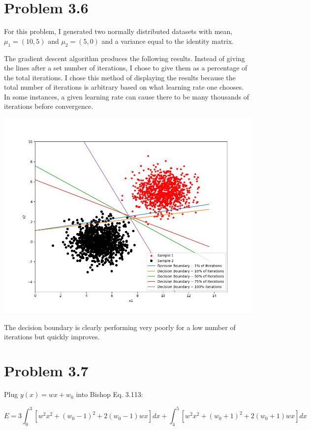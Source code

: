 \documentclass[12pt, letterpaper]{article}
\begin{document}
\section*{Problem 3.6}

For this problem, I generated two normally distributed datasets with mean, $\mu_{1} = (10, 5)$ and $\mu_{2} = (5, 0)$ and a variance equal to the identity matrix. 

The gradient descent algorithm produces the following results. Instead of giving the lines after a set number of iterations, I chose to give them as a percentage of the total iterations. I chose this method of displaying the results because the total number of iterations is arbitrary based on what learning rate one chooses. In some instances, a given learning rate can cause there to be many thousands of iterations before convergence. 

\begin{center}
\includegraphics[scale=0.6]{problem_6_a.png}
\end{center}

The decision boundary is clearly performing very poorly for a low number of iterations but quickly improves. 

\section*{Problem 3.7}

Plug $y(x) = w x + w_0$ into Bishop Eq. 3.113:

\begin{equation}
E=3 \int_{0}^{3}\left[w^{2} x^{2}+\left(w_{0}-1\right)^{2}+2\left(w_{0}-1\right) w x\right] d x+\int_{4}^{5}\left[w^{2} x^{2}+\left(w_{0}+1\right)^{2}+2\left(w_{0}+1\right) w x\right] d x
\end{equation}
\end{document}
